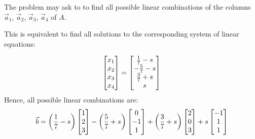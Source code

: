 \documentclass[pdf,9pt]{beamer}
\begin{document}

\begin{frame}[fragile]
\begin{remark}
    The problem may ask to to find \alert{all possible} linear combinations of
    the columns $\vec{a}_1$, $\vec{a}_2$, $\vec{a}_3$, $\vec{a}_4$ of $A$.
    \vspace{1em}\pause

    This is equivalent to find all solutions to the corresponding system of
    linear equations:

    \begin{align*}
        \begin{bmatrix}
	    x_1\cr x_2	\cr x_3\cr x_4
	\end{bmatrix}
	=
	\begin{bmatrix}
	    \frac{1}{7}-s\\
	   -\frac{5}{7} - s \\
	    \frac{3}{7} +s \cr
	    s
	\end{bmatrix}
    \end{align*}
    \vspace{1em}\pause
    Hence, all possible linear combinations are:
    \begin{align*}
	\vec{b} =
	\left(\frac{1}{7}-s\right) \begin{bmatrix} 1\\ 2 \cr 3  \end{bmatrix}
	-\left(\frac{5}{7}+s\right) \begin{bmatrix} 0 \cr -1 \cr 1 \end{bmatrix}
	+\left(\frac{3}{7}+s\right) \begin{bmatrix} 2\cr 0 \cr 3 \end{bmatrix}
	+s \begin{bmatrix} -1 \cr 1 \cr 1 \end{bmatrix}
    \end{align*}
\end{remark}


\end{frame}
\end{document}
